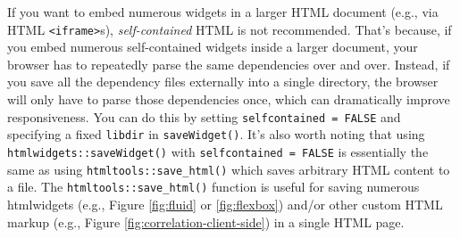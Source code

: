 \documentclass[
  12pt,
]{krantz}
\newenvironment{Shaded}{\begin{snugshade}}{\end{snugshade}}
\newcommand{\CommentTok}[1]{\textcolor[rgb]{0.56,0.35,0.01}{\textit{#1}}}
\newcommand{\ControlFlowTok}[1]{\textcolor[rgb]{0.13,0.29,0.53}{\textbf{#1}}}
\newcommand{\DataTypeTok}[1]{\textcolor[rgb]{0.13,0.29,0.53}{#1}}
\newcommand{\DecValTok}[1]{\textcolor[rgb]{0.00,0.00,0.81}{#1}}
\newcommand{\FloatTok}[1]{\textcolor[rgb]{0.00,0.00,0.81}{#1}}
\newcommand{\KeywordTok}[1]{\textcolor[rgb]{0.13,0.29,0.53}{\textbf{#1}}}
\newcommand{\NormalTok}[1]{#1}
\newcommand{\OperatorTok}[1]{\textcolor[rgb]{0.81,0.36,0.00}{\textbf{#1}}}
\newcommand{\StringTok}[1]{\textcolor[rgb]{0.31,0.60,0.02}{#1}}
\begin{document}
\begin{Shaded}
\end{Shaded}

If you want to embed numerous widgets in a larger HTML document (e.g., via HTML \texttt{\textless{}iframe\textgreater{}}s), \emph{self-contained} HTML is not recommended. That's because, if you embed numerous self-contained widgets inside a larger document, your browser has to repeatedly parse the same dependencies over and over. Instead, if you save all the dependency files externally into a single directory, the browser will only have to parse those dependencies once, which can dramatically improve responsiveness. You can do this by setting \texttt{selfcontained\ =\ FALSE} and specifying a fixed \texttt{libdir} in \texttt{saveWidget()}. It's also worth noting that using \texttt{htmlwidgets::saveWidget()} with \texttt{selfcontained\ =\ FALSE} is essentially the same as using \texttt{htmltools::save\_html()} which saves arbitrary HTML content to a file. The \texttt{htmltools::save\_html()} function is useful for saving numerous htmlwidgets (e.g., Figure \ref{fig:fluid} or \ref{fig:flexbox}) and/or other custom HTML markup (e.g., Figure \ref{fig:correlation-client-side}) in a single HTML page.
\end{document}
